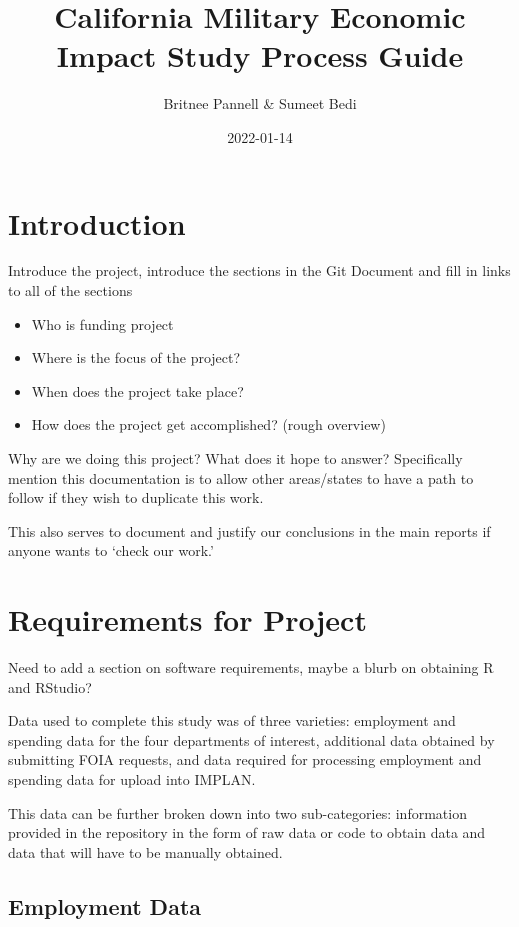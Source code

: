 \documentclass[
]{book}
\title{California Military Economic Impact Study Process Guide}
\author{Britnee Pannell \& Sumeet Bedi}
\date{2022-01-14}
\providecommand{\tightlist}{%
  \setlength{\itemsep}{0pt}\setlength{\parskip}{0pt}}
\begin{document}
\maketitle

{
\setcounter{tocdepth}{1}
\tableofcontents
}
\hypertarget{introduction}{%
\chapter{Introduction}\label{introduction}}

Introduce the project, introduce the sections in the Git Document and fill in links to all of the sections

\begin{itemize}
\tightlist
\item
  Who is funding project
\item
  Where is the focus of the project?
\item
  When does the project take place?
\item
  How does the project get accomplished? (rough overview)
\end{itemize}

Why are we doing this project? What does it hope to answer?
Specifically mention this documentation is to allow other areas/states to have a path to follow if they wish to duplicate this work.

This also serves to document and justify our conclusions in the main reports if anyone wants to `check our work.'

\hypertarget{requirements-for-project}{%
\chapter{Requirements for Project}\label{requirements-for-project}}

Need to add a section on software requirements, maybe a blurb on obtaining R and RStudio?

Data used to complete this study was of three varieties: employment and spending data for the four departments of interest, additional data obtained by submitting FOIA requests, and data required for processing employment and spending data for upload into IMPLAN.

This data can be further broken down into two sub-categories: information provided in the repository in the form of raw data or code to obtain data and data that will have to be manually obtained.

\hypertarget{employment-data}{%
\section{Employment Data}\label{employment-data}}
\end{document}
